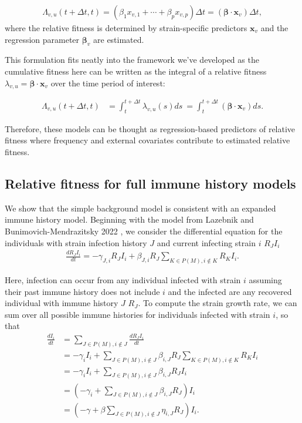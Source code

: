 \documentclass[11pt,oneside,letterpaper]{article}
\renewcommand{\vec}[1]{\boldsymbol{#1}}
\newcommand{\varEscape}{\eta}
\begin{document}
\begin{align}
    \Lambda_{v,u}(t + \Delta t,t) = (\beta_{1} x_{v,1} + \cdots + \beta_{p} x_{v, p})\Delta t = (\vec{\beta} \cdot \vec{x}_{v}) \Delta t,
\end{align}
where the relative fitness is determined by strain-specific predictors $\vec{x}_{v}$ and the regression parameter $\vec{\beta}_{v}$ are estimated.

This formulation fits neatly into the framework we've developed as the cumulative fitness here can be written as the integral of a relative fitness $\lambda_{v, u} =  \vec{\beta} \cdot \vec{x}_{v}$ over the time period of interest:

\begin{align}
    \Lambda_{v,u}(t + \Delta t,t)  &= \int_{t}^{t+\Delta t} \lambda_{v,u}(s)ds\ = \int_{t}^{t + \Delta t} (\vec{\beta} \cdot \vec{x}_{v}) ds.
\end{align}

Therefore, these models can be thought as regression-based predictors of relative fitness where frequency and external covariates contribute to estimated relative fitness.

\subsection{Relative fitness for full immune history models}\label{ssec:full_immune_history}

We show that the simple background model is consistent with an expanded immune history model.
Beginning with the model from Lazebnik and Bunimovich-Mendrazitsky 2022 \cite{Lazebnik2022}, we consider the differential equation for the individuals with strain infection history $J$ and current infecting strain $i$ $R_{J}I_{i}$
\begin{align}
\frac{dR_{J} I_{i}}{dt} = - \gamma_{J, i} R_{J} I_{i} + \beta_{J, i} R_{J} \sum_{K \in P(M), i\notin K} R_{K}I_{i}.
\end{align}

Here, infection can occur from any individual infected with strain $i$ assuming their past immune history does not include $i$ and the infected are any recovered individual with immune history $J$  $R_{J}$.
To compute the strain growth rate, we can sum over all possible immune histories for individuals infected with strain $i$, so that
\begin{align}
    \frac{d I_{i}}{d t} &= \sum_{J \in P(M), i \notin J} \frac{dR_{J} I_{i}}{dt} \\
                        &= - \gamma_{i} I_{i} + \sum_{J \in P(M), i \notin J} \beta_{i, J} R_{J} \sum_{K \in P(M), i\notin K} R_{K}I_{i}\\
                        &= - \gamma_{i} I_{i} + \sum_{J \in P(M), i \notin J} \beta_{i, J} R_{J} I_{i}\\
                        &= \left(-\gamma_{i} + \sum_{J \in P(M), i \notin J} \beta_{i,J} R_{J} \right) I_{i}\\
                        &= \left(-\gamma + \beta\sum_{J \in P(M), i \notin J} \varEscape_{i,J} R_{J} \right) I_{i}.\\
\end{align}
\end{document}
